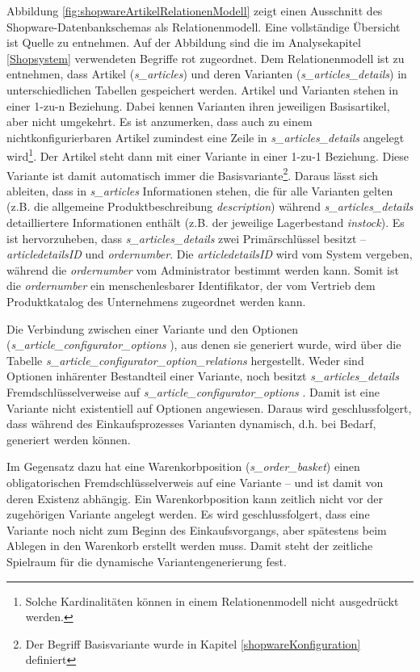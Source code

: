 \documentclass[11pt, a4paper, titlepage, listof=totoc, bibliography=totoc, index=totoc, twoside, openright, headings=normal, draft]{scrreprt}
\begin{document}
Abbildung \ref{fig:shopwareArtikelRelationenModell} zeigt einen Ausschnitt des Shopware-Datenbankschemas als Relationenmodell. Eine vollständige Übersicht ist Quelle \citet{shopwareDatabaseScheme} zu entnehmen. Auf der Abbildung sind die im Analysekapitel \ref{Shopsystem} verwendeten Begriffe rot zugeordnet. Dem Relationenmodell ist zu entnehmen, dass Artikel (\emph{s\_articles}) und deren Varianten (\emph{s\_articles\_details}) in unterschiedlichen Tabellen gespeichert werden. Artikel und Varianten stehen in einer 1-zu-n Beziehung. Dabei kennen Varianten ihren jeweiligen Basisartikel, aber nicht umgekehrt. Es ist anzumerken, dass auch zu einem nichtkonfigurierbaren Artikel zumindest eine Zeile in \emph{s\_articles\_details} angelegt wird\footnote{Solche Kardinalitäten können in einem Relationenmodell nicht ausgedrückt werden.}. Der Artikel steht dann mit einer Variante in einer 1-zu-1 Beziehung. Diese Variante ist damit automatisch immer die Basisvariante\footnote{Der Begriff Basisvariante wurde in Kapitel \ref{shopwareKonfiguration} definiert}. Daraus lässt sich ableiten, dass in \emph{s\_articles} Informationen stehen, die für alle Varianten gelten (z.B. die allgemeine Produktbeschreibung \emph{description}) während \emph{s\_articles\_details} detailliertere Informationen enthält (z.B. der jeweilige Lagerbestand \emph{instock}). Es ist hervorzuheben, dass \emph{s\_articles\_details} zwei Primärschlüssel besitzt -- \emph{articledetailsID} und \emph{ordernumber}. Die \emph{articledetailsID} wird vom System vergeben, während die \emph{ordernumber} vom Administrator bestimmt werden kann. Somit ist die \emph{ordernumber} ein menschenlesbarer Identifikator, der vom Vertrieb dem Produktkatalog des Unternehmens zugeordnet werden kann.

Die Verbindung zwischen einer Variante und den Optionen (\emph{s\_article\_configurator\_options }), aus denen sie generiert wurde, wird über die Tabelle \emph{s\_article\_configurator\_option\_relations} hergestellt. Weder sind Optionen inhärenter Bestandteil einer Variante, noch besitzt \emph{s\_articles\_details} Fremdschlüsselverweise auf \emph{s\_article\_configurator\_options }. Damit ist eine Variante nicht existentiell auf Optionen angewiesen. Daraus wird geschlussfolgert, dass während des Einkaufsprozesses Varianten dynamisch, d.h. bei Bedarf, generiert werden können.

Im Gegensatz dazu hat eine Warenkorbposition (\emph{s\_order\_basket}) einen obligatorischen Fremdschlüsselverweis auf eine Variante -- und ist damit von deren Existenz abhängig. Ein Warenkorbposition kann zeitlich nicht vor der zugehörigen Variante angelegt werden. Es wird geschlussfolgert, dass eine Variante noch nicht zum Beginn des Einkaufsvorgangs, aber spätestens beim Ablegen in den Warenkorb erstellt werden muss. Damit steht der zeitliche Spielraum für die dynamische Variantengenerierung fest.
\end{document}
